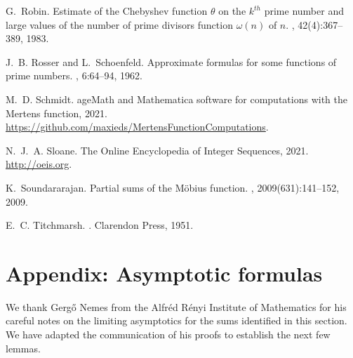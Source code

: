\documentclass[11pt,reqno,a4letter]{article}
\numberwithin{figure}{section}
\numberwithin{table}{section}
\theoremstyle{plain}
\numberwithin{theorem}{section}
\theoremstyle{definition}
\begin{document}
\begin{thebibliography}{10}
G.~Robin.
\newblock Estimate of the {C}hebyshev function $\theta$ on the $k^{th}$ prime
  number and large values of the number of prime divisors function $\omega(n)$
  of $n$.
, 42(4):367--389, 1983.

J.~B. Rosser and L.~Schoenfeld.
\newblock Approximate formulas for some functions of prime numbers.
, 6:64--94, 1962.

M.~D. Schmidt.
age{M}ath and {M}athematica software for computations with the
  {M}ertens function, 2021.
\newblock \url{https://github.com/maxieds/MertensFunctionComputations}.

N.~J.~A. Sloane.
\newblock The {O}nline {E}ncyclopedia of {I}nteger {S}equences, 2021.
\newblock \url{http://oeis.org}.

K.~Soundararajan.
\newblock Partial sums of the {M}{\"{o}}bius function.
, 2009(631):141--152, 2009.

E.~C. Titchmarsh.
.
\newblock Clarendon Press, 1951.

\end{thebibliography}

\setcounter{section}{0} 
\renewcommand{\thesection}{\Alph{section}} 

\newpage
\section{Appendix: Asymptotic formulas} 
\label{subSection_OtherFactsAndResults} 

We thank Gerg\H{o} Nemes from the Alfr\'{e}d R\'{e}nyi Institute of Mathematics for his 
careful notes on the limiting asymptotics for the sums identified in this section. 
We have adapted the communication of his proofs to establish the next few lemmas. 
\end{document}
